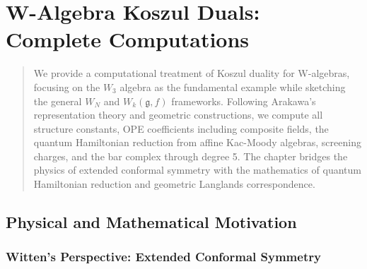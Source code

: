 
\chapter{W-Algebra Koszul Duals: Complete Computations}\label{chap:w-algebra-koszul}

\begin{abstract}
We provide a computational treatment of Koszul duality for W-algebras, focusing on the $W_3$ algebra as the fundamental example while sketching the general $W_N$ and $W_k(\mathfrak{g}, f)$ frameworks. Following Arakawa's representation theory and geometric constructions, we compute all structure constants, OPE coefficients including composite fields, the quantum Hamiltonian reduction from affine Kac-Moody algebras, screening charges, and the bar complex through degree 5. The chapter bridges the physics of extended conformal symmetry with the mathematics of quantum Hamiltonian reduction and geometric Langlands correspondence.
\end{abstract}

\section{Physical and Mathematical Motivation}

\subsection{Witten's Perspective: Extended Conformal Symmetry}

